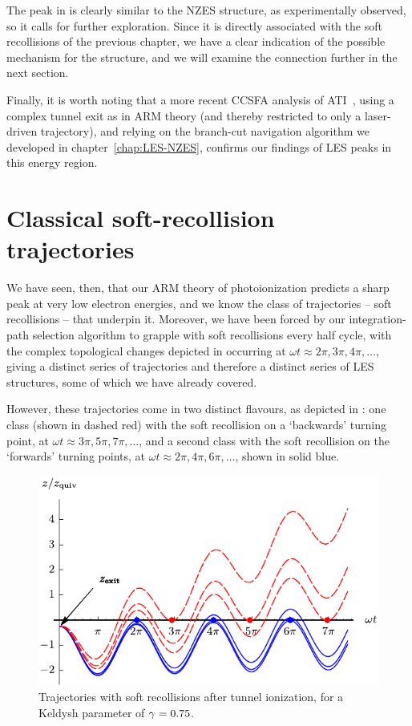 The peak in  is clearly similar to the NZES structure, as experimentally observed, so it calls for further exploration. Since it is directly associated with the soft recollisions of the previous chapter, we have a clear indication of the possible mechanism for the structure, and we will examine the connection further in the next section.




Finally, it is worth noting that a more recent CCSFA analysis of ATI~\cite{ keil_branch-cuts_2016}, using a complex tunnel exit as in ARM theory (and thereby restricted to only a laser-driven trajectory), and relying on the branch-cut navigation algorithm we developed in chapter~\ref{chap:LES-NZES}, confirms our findings of LES peaks in this energy region.









\section{Classical soft-recollision trajectories}
\label{sec:classical-soft-recollisions}
We have seen, then, that our ARM theory of photoionization predicts a sharp peak at very low electron energies, and we know the class of trajectories -- soft recollisions -- that underpin it. Moreover, we have been forced by our integration-path selection algorithm to grapple with soft recollisions every half cycle, with the complex topological changes depicted in  occurring at $\omega t\approx 2\pi,3\pi,4\pi,\ldots$, giving a distinct series of trajectories and therefore a distinct series of LES structures, some of which we have already covered.

However, these trajectories come in two distinct flavours, as depicted in : one class (shown in dashed red) with the soft recollision on a `backwards' turning point, at $\omega t\approx 3\pi, 5\pi, 7\pi, \ldots$, and a second class with the soft recollision on the `forwards' turning points, at $\omega t\approx 2\pi, 4\pi, 6\pi, \ldots$, shown in solid blue.

\begin{figure}[ht]
  \centering
  \includegraphics[width=0.6\columnwidth]{6-LES/Figures/figure6-2D.pdf}
  \caption[
  Trajectories with soft recollisions, both on the backwards swing and the forwards turning point
  ]{
  Trajectories with soft recollisions after tunnel ionization, for a Keldysh parameter of  $\gamma=0.75$.}
  \label{f6-trajectories-at-transitions}
\end{figure}

